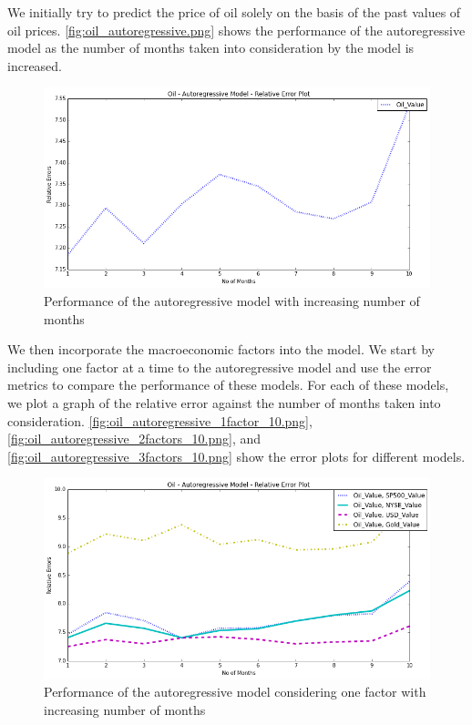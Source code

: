 \documentclass[runningheads]{llncs}
\begin{document}
We initially try to predict the price of oil solely on the basis of the past values of oil prices. \autoref{fig:oil_autoregressive.png} shows the performance of the autoregressive model as the number of months taken into consideration by the model is increased. \\

\begin{figure}
\centering
\includegraphics[width=\textwidth]{oil_autoregressive.png}
\caption{Performance of the autoregressive model with increasing number of months}
\label{fig:oil_autoregressive.png}
\end{figure}

We then incorporate the macroeconomic factors into the model. We start by including one factor at a time to the autoregressive model and use the error metrics to compare the performance of these models. For each of these models, we plot a graph of the relative error against the number of months taken into consideration. \autoref{fig:oil_autoregressive_1factor_10.png}, \autoref{fig:oil_autoregressive_2factors_10.png}, and \autoref{fig:oil_autoregressive_3factors_10.png} show the error plots for different models. 

\begin{figure}
\centering
\includegraphics[width=\textwidth]{oil_autoregressive_1factor_10.png}
\caption{Performance of the autoregressive model considering one factor with increasing number of months}
\label{fig:oil_autoregressive_1factor_10.png}
\end{figure}
\end{document}
